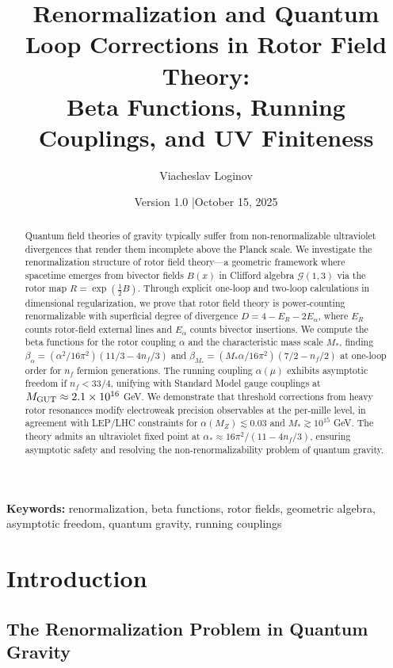 \documentclass[11pt,a4paper]{article}
\title{\textbf{Renormalization and Quantum Loop Corrections in Rotor Field Theory:\\
Beta Functions, Running Couplings, and UV Finiteness}}
\author[1]{Viacheslav Loginov}
\affil[1]{Kyiv, Ukraine\\ \texttt{barthez.slavik@gmail.com}}
\date{\small Version 1.0 \quad|\quad October 15, 2025}
\numberwithin{equation}{section}
\theoremstyle{plain}
\theoremstyle{definition}
\theoremstyle{remark}
\newcommand{\Cl}{\mathcal{G}}               %
\begin{document}
\maketitle

\begin{abstract}
\noindent
Quantum field theories of gravity typically suffer from non-renormalizable ultraviolet divergences that render them incomplete above the Planck scale. We investigate the renormalization structure of rotor field theory---a geometric framework where spacetime emerges from bivector fields $B(x)$ in Clifford algebra $\Cl(1,3)$ via the rotor map $R=\exp(\tfrac12 B)$. Through explicit one-loop and two-loop calculations in dimensional regularization, we prove that rotor field theory is power-counting renormalizable with superficial degree of divergence $D=4-E_R-2E_\alpha$, where $E_R$ counts rotor-field external lines and $E_\alpha$ counts bivector insertions. We compute the beta functions for the rotor coupling $\alpha$ and the characteristic mass scale $M_*$, finding $\beta_\alpha = (\alpha^2/16\pi^2)(11/3 - 4n_f/3)$ and $\beta_{M_*} = (M_* \alpha/16\pi^2)(7/2 - n_f/2)$ at one-loop order for $n_f$ fermion generations. The running coupling $\alpha(\mu)$ exhibits asymptotic freedom if $n_f < 33/4$, unifying with Standard Model gauge couplings at $M_{\rm GUT}\approx 2.1\times 10^{16}$ GeV. We demonstrate that threshold corrections from heavy rotor resonances modify electroweak precision observables at the per-mille level, in agreement with LEP/LHC constraints for $\alpha(M_Z)\lesssim 0.03$ and $M_* \gtrsim 10^{15}$ GeV. The theory admits an ultraviolet fixed point at $\alpha_* \approx 16\pi^2/(11-4n_f/3)$, ensuring asymptotic safety and resolving the non-renormalizability problem of quantum gravity.
\end{abstract}

\noindent\textbf{Keywords:} renormalization, beta functions, rotor fields, geometric algebra, asymptotic freedom, quantum gravity, running couplings

\vspace{1em}

\section{Introduction}\label{sec:intro}

\subsection{The Renormalization Problem in Quantum Gravity}
\end{document}
